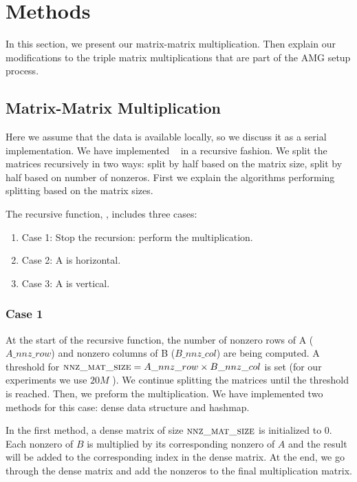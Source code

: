 \section{Methods}
\label{sec:methods}

In this section, we present our matrix-matrix multiplication. Then explain our modifications to the triple matrix multiplications that are part of the AMG setup process.

\subsection{Matrix-Matrix Multiplication}
\label{sec:matmult}

Here we assume that the data is available locally, so we discuss it as a serial implementation. We have implemented \mm~ in a recursive fashion. We split the matrices recursively in two ways: split by half based on the matrix size, split by half based on number of nonzeros. First we explain the algorithms performing splitting based on the matrix sizes.

The recursive function, \recmm, includes three cases:
\begin{enumerate}
 \item Case 1: Stop the recursion: perform the multiplication.
 \item Case 2: A is horizontal.
 \item Case 3: A is vertical.
\end{enumerate}

\subsubsection{Case 1}
\label{sec:case1}
At the start of the recursive function, the number of nonzero rows of A ($A\_nnz\_row$) and nonzero columns of B ($B\_nnz\_col$) are being computed. A threshold for $\textsc{nnz\_mat\_size} = A\_nnz\_row \times B\_nnz\_col$ is set (for our experiments we use $20M$ ).
We continue splitting the matrices until the threshold is reached. Then, we preform the multiplication. We have implemented two methods for this case: dense data structure and hashmap.

In the first method, a dense matrix of size $\textsc{nnz\_mat\_size}$ is initialized to $0$. Each nonzero of $B$ is multiplied by its corresponding nonzero of $A$ and the result will be added to the corresponding index in the dense matrix. At the end, we go through the dense matrix and add the nonzeros to the final multiplication matrix.

